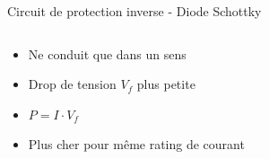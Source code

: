 \begin{frame}{Circuit de protection inverse - Diode Schottky}
    \begin{columns}
        \begin{column}{0.33\textwidth}
            \begin{itemize}
                \item Ne conduit que dans un sens
                \bigskip
                \item Drop de tension $V_f$ plus petite
                \item $P = I \cdot V_f$
                \bigskip
                \item Plus cher pour même rating de courant
            \end{itemize}
        \end{column}
        \begin{column}{0.66\textwidth}
            \begin{center}
            \vspace{-24pt}
            \end{center}
        \end{column}
    \end{columns}
\end{frame}

